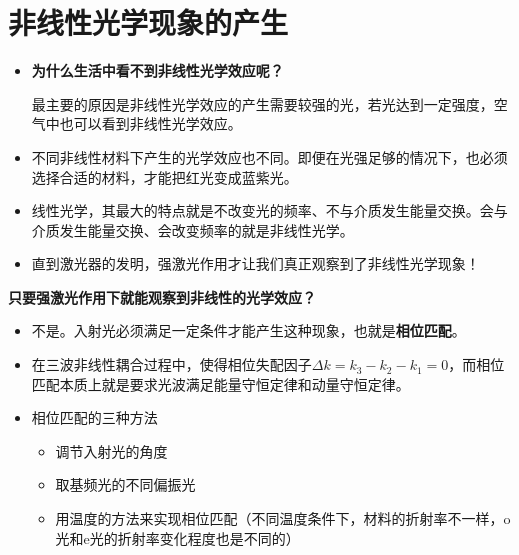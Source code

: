 \documentclass{beamer}
\newenvironment{slide}{
    \begin{frame}{\bfseries{\sectiontitle}}
}{
    \end{frame}
}
\let\sectiononly\section
\renewcommand{\section}[1]{
    \sectiononly{#1}
    \let\sectiontitle\relax
    \newcommand{\sectiontitle}{#1}
}
\begin{document}
\section{非线性光学现象的产生}

\begin{slide}
    \begin{itemize}
        \item \textbf{为什么生活中看不到非线性光学效应呢？}

        最主要的原因是非线性光学效应的产生需要较强的光，若光达到一定强度，空气中也可以看到非线性光学效应。

        \item 不同非线性材料下产生的光学效应也不同。即便在光强足够的情况下，也必须选择合适的材料，才能把红光变成蓝紫光。

        \item 线性光学，其最大的特点就是不改变光的频率、不与介质发生能量交换。会与介质发生能量交换、会改变频率的就是非线性光学。

        \item 直到激光器的发明，强激光作用才让我们真正观察到了非线性光学现象！
    \end{itemize}
\end{slide}

\begin{slide}
    \textbf{只要强激光作用下就能观察到非线性的光学效应？}
    \medskip

    \begin{itemize}
        \item 不是。入射光必须满足一定条件才能产生这种现象，也就是\textbf{相位匹配}。

        \item 在三波非线性耦合过程中，使得相位失配因子$Δk=k_3-k_2-k_1=0$，而相位匹配本质上就是要求光波满足能量守恒定律和动量守恒定律。

        \item 相位匹配的三种方法
        \begin{itemize}
            \item 调节入射光的角度
            \item 取基频光的不同偏振光
            \item 用温度的方法来实现相位匹配（不同温度条件下，材料的折射率不一样，o光和e光的折射率变化程度也是不同的）
        \end{itemize}
    \end{itemize}
\end{slide}
\end{document}
